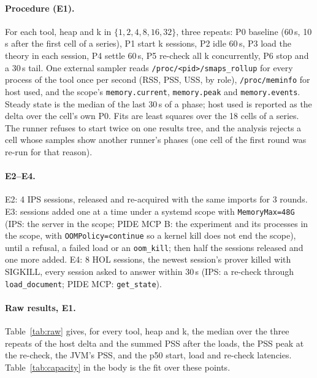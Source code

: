 \documentclass[11pt]{article}
\newcommand{\code}[1]{\colorbox{gray!12}{\texttt{\vphantom{Ag}#1}}}
\begin{document}
\paragraph{Procedure (E1).} For each tool, heap and k in
$\{1,2,4,8,16,32\}$, three repeats: P0 baseline (60\,s, 10\,s after the
first cell of a series), P1 start k sessions, P2 idle 60\,s, P3 load the
theory in each session, P4 settle 60\,s, P5 re-check all k concurrently,
P6 stop and a 30\,s tail. One external sampler reads
\code{/proc/<pid>/smaps\_rollup} for every process of the tool once per
second (RSS, PSS, USS, by role), \code{/proc/meminfo} for host used, and
the scope's \code{memory.current}, \code{memory.peak} and
\code{memory.events}. Steady state is the median of the last 30\,s of a
phase; host used is reported as the delta over the cell's own P0. Fits are
least squares over the 18 cells of a series. The runner refuses to start
twice on one results tree, and the analysis rejects a cell whose samples
show another runner's phases (one cell of the first round was re-run for
that reason).

\paragraph{E2--E4.} E2: 4 IPS sessions, released and re-acquired with the
same imports for 3 rounds. E3: sessions added one at a time under a
systemd scope with \code{MemoryMax=48G} (IPS: the server in the scope;
PIDE MCP B: the experiment and its processes in the scope, with
\code{OOMPolicy=continue} so a kernel kill does not end the scope), until
a refusal, a failed load or an \code{oom\_kill}; then half the sessions
released and one more added. E4: 8 HOL sessions, the newest session's
prover killed with SIGKILL, every session asked to answer within 30\,s
(IPS: a re-check through \code{load\_document}; PIDE MCP:
\code{get\_state}).

\paragraph{Raw results, E1.} Table~\ref{tab:raw} gives, for every tool,
heap and k, the median over the three repeats of the host delta and the
summed PSS after the loads, the PSS peak at the re-check, the JVM's PSS,
and the p50 start, load and re-check latencies. Table~\ref{tab:capacity}
in the body is the fit over these points.
\end{document}

